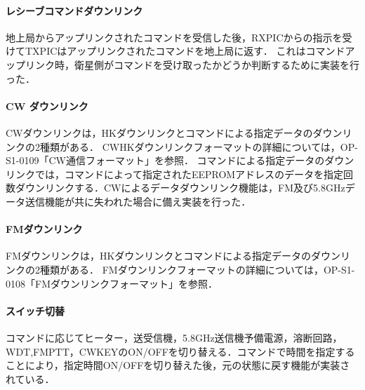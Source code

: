 \paragraph{レシーブコマンドダウンリンク}
地上局からアップリンクされたコマンドを受信した後，RXPICからの指示を受けてTXPICはアップリンクされたコマンドを地上局に返す．
これはコマンドアップリンク時，衛星側がコマンドを受け取ったかどうか判断するために実装を行った．

\paragraph{CW ダウンリンク}
CWダウンリンクは，HKダウンリンクとコマンドによる指定データのダウンリンクの2種類がある．
CWHKダウンリンクフォーマットの詳細については，OP-S1-0109「CW通信フォーマット」を参照．
コマンドによる指定データのダウンリンクでは，コマンドによって指定されたEEPROMアドレスのデータを指定回数ダウンリンクする．CWによるデータダウンリンク機能は，FM及び5.8GHzデータ送信機能が共に失われた場合に備え実装を行った．

\paragraph{FMダウンリンク}
FMダウンリンクは，HKダウンリンクとコマンドによる指定データのダウンリンクの2種類がある．
FMダウンリンクフォーマットの詳細については，OP-S1-0108「FMダウンリンクフォーマット」を参照．

\paragraph{スイッチ切替}
コマンドに応じてヒーター，送受信機，5.8GHz送信機予備電源，溶断回路，WDT,FMPTT，CWKEYのON/OFFを切り替える．コマンドで時間を指定することにより，指定時間ON/OFFを切り替えた後，元の状態に戻す機能が実装されている．

